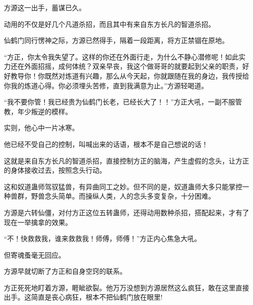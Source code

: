 \begin{this_body}
方源这一出手，蓄谋已久。

动用的不仅是好几个凡道杀招，而且其中有来自东方长凡的智道杀招。

仙鹤门同行愣神之际，方源已然得手，隔着一段距离，将方正禁锢在原地。

“方正，你太令我失望了。这样的你还在外面行走，为什么不静心潜修呢！如此实力还在外面招摇，成何体统？双亲早丧，我这个做哥哥的就要起到父亲的职责，好好教导你！你既然对炼道有兴趣，那么从今天起，你就跟随在我的身边，我传授给你我的炼道心得。你必须埋头苦修，直到我满意为止。”方源轻喝道。

“我不要你管！我已经贵为仙鹤门长老，已经长大了！！”方正大吼，一副不服管教，年少叛逆的模样。

实则，他心中一片冰寒。

他已经不受自己的控制，叫喊出来的话语，根本不是自己想说的话！

这就是来自东方长凡的智道杀招，直接控制方正的脑海，产生虚假的念头，让方正的身体接收过去，按照念头行动。

这和奴道蛊师驾驭猛兽，有异曲同工之妙。但不同的是，奴道蛊师大多只能掌控一种兽群，野兽念头简单。而操纵人类，人的念头多变复杂，十分困难。

方源是六转仙僵，对付方正这位五转蛊师，还得动用数种杀招，搭配起来，才有了现在一举擒拿的效果。

“不！快救救我，谁来救救我！师傅，师傅！”方正内心焦急大吼。

但寄魂蚤毫无回应。

方源早就切断了方正和自身空窍的联系。

方正死死地盯着方源，睚眦欲裂。他万万没想到方源居然这么疯狂，敢在这里直接出手。这简直是丧心病狂，根本不把仙鹤门放在眼里!

\end{this_body}

